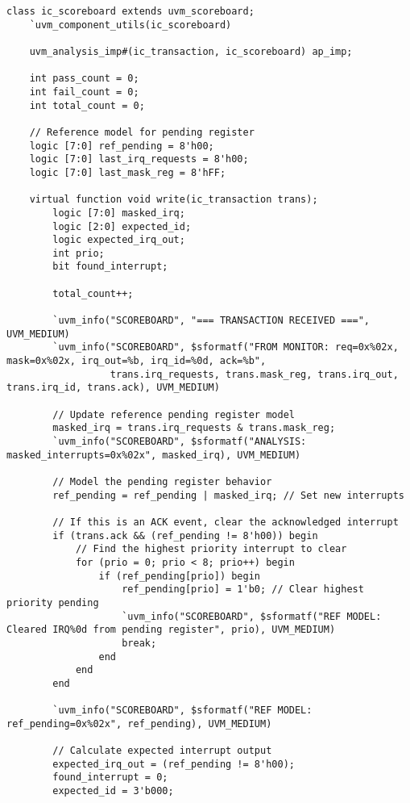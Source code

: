 \documentclass[12pt,a4paper]{article}
\begin{document}
\begin{lstlisting}[caption=Scoreboard with Reference Model, label=lst:scoreboard]
class ic_scoreboard extends uvm_scoreboard;
    `uvm_component_utils(ic_scoreboard)
    
    uvm_analysis_imp#(ic_transaction, ic_scoreboard) ap_imp;
    
    int pass_count = 0;
    int fail_count = 0;
    int total_count = 0;
    
    // Reference model for pending register
    logic [7:0] ref_pending = 8'h00;
    logic [7:0] last_irq_requests = 8'h00;
    logic [7:0] last_mask_reg = 8'hFF;
    
    virtual function void write(ic_transaction trans);
        logic [7:0] masked_irq;
        logic [2:0] expected_id;
        logic expected_irq_out;
        int prio;
        bit found_interrupt;
        
        total_count++;
        
        `uvm_info("SCOREBOARD", "=== TRANSACTION RECEIVED ===", UVM_MEDIUM)
        `uvm_info("SCOREBOARD", $sformatf("FROM MONITOR: req=0x%02x, mask=0x%02x, irq_out=%b, irq_id=%0d, ack=%b", 
                  trans.irq_requests, trans.mask_reg, trans.irq_out, trans.irq_id, trans.ack), UVM_MEDIUM)
        
        // Update reference pending register model
        masked_irq = trans.irq_requests & trans.mask_reg;
        `uvm_info("SCOREBOARD", $sformatf("ANALYSIS: masked_interrupts=0x%02x", masked_irq), UVM_MEDIUM)
        
        // Model the pending register behavior
        ref_pending = ref_pending | masked_irq; // Set new interrupts
        
        // If this is an ACK event, clear the acknowledged interrupt
        if (trans.ack && (ref_pending != 8'h00)) begin
            // Find the highest priority interrupt to clear
            for (prio = 0; prio < 8; prio++) begin
                if (ref_pending[prio]) begin
                    ref_pending[prio] = 1'b0; // Clear highest priority pending
                    `uvm_info("SCOREBOARD", $sformatf("REF MODEL: Cleared IRQ%0d from pending register", prio), UVM_MEDIUM)
                    break;
                end
            end
        end
        
        `uvm_info("SCOREBOARD", $sformatf("REF MODEL: ref_pending=0x%02x", ref_pending), UVM_MEDIUM)
        
        // Calculate expected interrupt output
        expected_irq_out = (ref_pending != 8'h00);
        found_interrupt = 0;
        expected_id = 3'b000;
        

\end{lstlisting}
\end{document}
